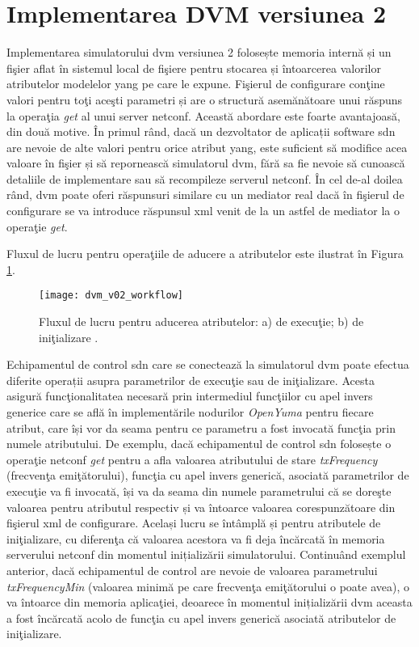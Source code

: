 \section{Implementarea DVM versiunea 2}

Implementarea simulatorului \gls{dvm} versiunea 2 folosește memoria internă și un fişier aflat în sistemul local de fişiere pentru stocarea și întoarcerea valorilor atributelor modelelor \gls{yang} pe care le expune. Fişierul de configurare conţine valori pentru toţi aceşti parametri și are o structură asemănătoare unui răspuns la operaţia \textit{get} al unui server \gls{netconf}. Această abordare este foarte avantajoasă, din două motive. În primul rând, dacă un dezvoltator de aplicații software \gls{sdn} are nevoie de alte valori pentru orice atribut \gls{yang}, este suficient să modifice acea valoare în fişier și să repornească simulatorul \gls{dvm}, fără sa fie nevoie să cunoască detaliile de implementare sau să recompileze serverul \gls{netconf}. În cel de-al doilea rând, \gls{dvm} poate oferi răspunsuri similare cu un mediator real dacă în fişierul de configurare se va introduce răspunsul \gls{xml} venit de la un astfel de mediator la o operaţie \textit{get}.

Fluxul de lucru pentru operaţiile de aducere a atributelor este ilustrat în Figura \ref{fig:dvm_v02_workflow}.

\begin{figure}[h]
	\centering
	\texttt{[image: dvm\_v02\_workflow]}
	\caption{Fluxul de lucru pentru aducerea atributelor: a) de execuţie; b) de iniţializare \cite{stancu2017enabling}.}
	\label{fig:dvm_v02_workflow}
\end{figure}

Echipamentul de control \gls{sdn} care se conectează la simulatorul \gls{dvm} poate efectua diferite operații asupra parametrilor de execuţie sau de iniţializare. Acesta asigură funcţionalitatea necesară prin intermediul funcţiilor cu apel invers generice care se află în implementările nodurilor \textit{OpenYuma} pentru fiecare atribut, care își vor da seama pentru ce parametru a fost invocată funcţia prin numele atributului. De exemplu, dacă echipamentul de control \gls{sdn} folosește o operaţie \gls{netconf} \textit{get} pentru a afla valoarea atributului de stare \textit{txFrequency} (frecvenţa emiţătorului), funcţia cu apel invers generică, asociată parametrilor de execuţie va fi invocată, își va da seama din numele parametrului că se doreşte valoarea pentru atributul respectiv și va întoarce valoarea corespunzătoare din fişierul \gls{xml} de configurare. Același lucru se întâmplă și pentru atributele de iniţializare, cu diferenţa că valoarea acestora va fi deja încărcată în memoria serverului \gls{netconf} din momentul inițializării simulatorului. Continuând exemplul anterior, dacă echipamentul de control are nevoie de valoarea parametrului \textit{txFrequencyMin} (valoarea minimă pe care frecvenţa emiţătorului o poate avea), o va întoarce din memoria aplicaţiei, deoarece în momentul inițializării \gls{dvm} aceasta a fost încărcată acolo de funcţia cu apel invers generică asociată atributelor de iniţializare.

